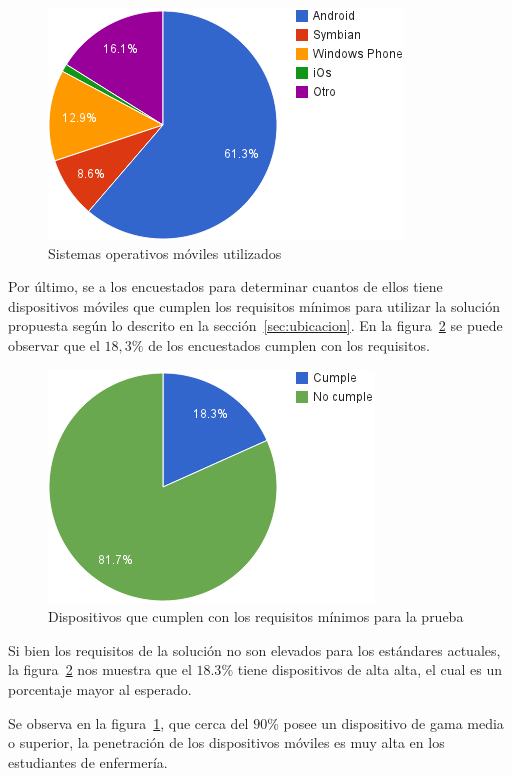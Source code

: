 \begin{figure}[H]
\centering
\includegraphics[scale=0.5]{resultados/imagenes/ubicacion_sistemas_operativos.png}
\caption{Sistemas operativos móviles utilizados}
\label{fig:ubicacion_sistemas_operativos}
\end{figure}

Por último, se  a los encuestados para determinar cuantos de ellos
tiene dispositivos móviles que cumplen los requisitos mínimos para utilizar la
solución propuesta según lo descrito en la sección~\ref{sec:ubicacion}. En la
figura~\ref{fig:ubicacion_requisitos_minimos} se puede observar que el $18,3\%$
de los encuestados cumplen con los requisitos.

\begin{figure}[H]
\centering
\includegraphics[scale=0.5]{resultados/imagenes/ubicacion_requisitos_minimos.png}
\caption{Dispositivos que cumplen con los requisitos mínimos para la prueba}
\label{fig:ubicacion_requisitos_minimos}
\end{figure}

Si bien los requisitos de la solución no son elevados para los estándares
actuales, la figura~\ref{fig:ubicacion_requisitos_minimos} nos muestra que el
$18.3\%$ tiene dispositivos de alta alta, el cual es un porcentaje mayor al
esperado.

Se observa en la figura~\ref{fig:ubicacion_sistemas_operativos}, que cerca del
$90\%$ posee un dispositivo de gama media o superior, la penetración de los
dispositivos móviles es muy alta en los estudiantes de enfermería.
